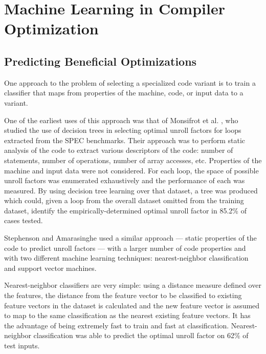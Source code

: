 \documentclass[msthesis,justified,copyright,final,numbers,sort&compress,
gsmodern,amstex,natbib]{uothesis}
\begin{document}

\chapter{Machine Learning in Compiler Optimization}
\label{learning}

\section{Predicting Beneficial Optimizations}
\label{predicting}

One approach to the problem of selecting a specialized code variant is to train a classifier that maps from properties of the machine, code, or input data to a variant.

One of the earliest uses of this approach was that of Monsifrot et al. \cite{heuristics}, who studied the use of decision trees in selecting optimal unroll factors for loops extracted from the SPEC benchmarks. Their approach was to perform static analysis of the code to extract various descriptors of the code: number of statements, number of operations, number of array accesses, etc. Properties of the machine and input data were not considered. For each loop, the space of possible unroll factors was enumerated exhaustively and the performance of each was measured. By using decision tree learning over that dataset, a tree was produced which could, given a loop from the overall dataset omitted from the training dataset, identify the empirically-determined optimal unroll factor in 85.2\% of cases tested.

Stephenson and Amarasinghe \cite{unroll} used a similar approach --- static properties of the code to predict unroll factors --- with a larger number of code properties and with two different machine learning techniques: nearest-neighbor classification and support vector machines. 

Nearest-neighbor classifiers are very simple: using a distance measure defined over the features, the distance from the feature vector to be classified to existing feature vectors in the dataset is calculated and the new feature vector is assumed to map to the same classification as the nearest existing feature vectors. It has the advantage of being extremely fast to train and fast at classification. Nearest-neighbor classification was able to predict the optimal unroll factor on 62\% of test inputs.
\end{document}
